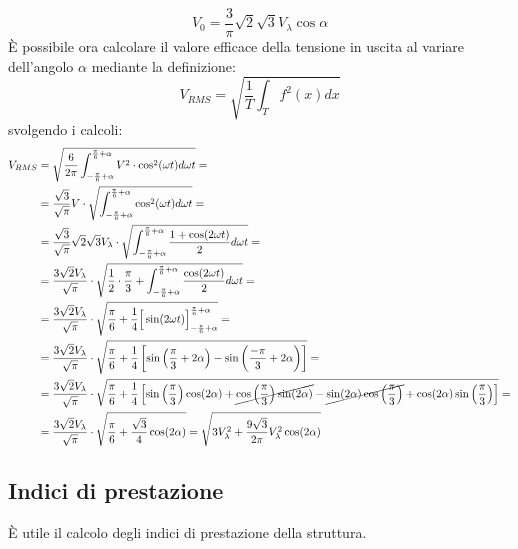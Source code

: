 \documentclass[a4paper,10pt]{article}
\begin{document}
\begin{equation}
 V_0 = \frac{3}{\pi} \sqrt{2} \sqrt{3} V_\lambda \cos\alpha
 \label{eq:valore_medio_tensione_ponte}
\end{equation}
È possibile ora calcolare il valore efficace della tensione in uscita al variare 
dell'angolo \(\alpha\) mediante la definizione:
\begin{equation}
V_{RMS} = \sqrt{\frac{1}{T}\int_T f^2(x)dx}
\end{equation}
svolgendo i calcoli:
\begin{align*}
V_{RMS} &= \sqrt{\frac{6}{2\pi}\int_{-\frac{\pi}{6}+\alpha}^{\frac{\pi}{6}+\alpha}V^2\cdot \cos^2(\omega t) d\omega t  } = \\
&= \frac{\sqrt{3}}{\sqrt{\pi}}V \cdot \sqrt{\int_{-\frac{\pi}{6}+\alpha}^{\frac{\pi}{6}+\alpha} \cos^2(\omega t) d\omega t  } = \\
&= \frac{\sqrt{3}}{\sqrt{\pi}}\sqrt{2} \sqrt{3} V_\lambda\cdot \sqrt{\int_{-\frac{\pi}{6}+\alpha}^{\frac{\pi}{6}+\alpha} \frac{1+\cos(2\omega t)}{2}d\omega t } = \\
&= \frac{3\sqrt{2}V_{\lambda}}{\sqrt{\pi}}\cdot \sqrt{\frac{1}{2}\cdot\frac{\pi}{3} + \int_{-\frac{\pi}{6}+\alpha}^{\frac{\pi}{6}+\alpha} \frac{\cos(2\omega t)}{2}d\omega t } =\\
&= \frac{3\sqrt{2}V_{\lambda}}{\sqrt{\pi}}\cdot \sqrt{ \frac{\pi}{6} +\frac{1}{4}\Big[\sin(2\omega t)\Big]_{-\frac{\pi}{6}+\alpha}^{\frac{\pi}{6}+\alpha} } =\\
&= \frac{3\sqrt{2}V_{\lambda}}{\sqrt{\pi}}\cdot \sqrt{\frac{\pi}{6} + \frac{1}{4}\left[\sin\left(\frac{\pi}{3}+2\alpha\right) - \sin\left(\frac{-\pi}{3}+2\alpha\right)\right] }= \\
&= \frac{3\sqrt{2}V_{\lambda}}{\sqrt{\pi}}\cdot \sqrt{\frac{\pi}{6} + \frac{1}{4}\left[\sin\left(\frac{\pi}{3}\right)\cos(2\alpha) + \cancel{\cos\left(\frac{\pi}{3}\right)\sin(2\alpha)} -\cancel{\sin(2\alpha)\cos\left(\frac{\pi}{3}\right)} + \cos(2\alpha)\sin\left(\frac{\pi}{3}\right)\right]  } =\\
&=\frac{3\sqrt{2}V_{\lambda}}{\sqrt{\pi}}\cdot \sqrt{\frac{\pi}{6} + \frac{\sqrt{3}}{4}\cos(2\alpha) } = \sqrt{3V_\lambda^2 + \frac{9\sqrt{3}}{2\pi}V_\lambda^2\cos(2\alpha)}
\end{align*}
\subsection{Indici di prestazione}
È utile il calcolo degli indici di prestazione della struttura.
\end{document}
